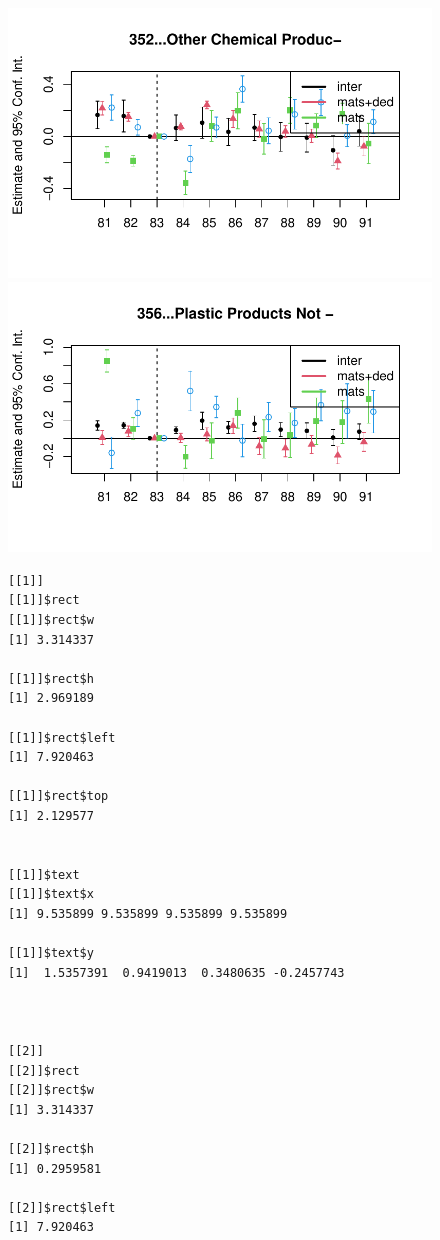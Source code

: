 \documentclass[
  12pt]{article}
\theoremstyle{definition}
\theoremstyle{remark}
\begin{document}
\begin{figure}
\begin{minipage}{\linewidth}
\includegraphics{Tax-Prod_files/figure-pdf/unnamed-chunk-11-15.pdf}

\includegraphics{Tax-Prod_files/figure-pdf/unnamed-chunk-11-16.pdf}

\begin{verbatim}
[[1]]
[[1]]$rect
[[1]]$rect$w
[1] 3.314337

[[1]]$rect$h
[1] 2.969189

[[1]]$rect$left
[1] 7.920463

[[1]]$rect$top
[1] 2.129577


[[1]]$text
[[1]]$text$x
[1] 9.535899 9.535899 9.535899 9.535899

[[1]]$text$y
[1]  1.5357391  0.9419013  0.3480635 -0.2457743



[[2]]
[[2]]$rect
[[2]]$rect$w
[1] 3.314337

[[2]]$rect$h
[1] 0.2959581

[[2]]$rect$left
[1] 7.920463


\end{verbatim}
\end{minipage}
\end{figure}
\end{document}
